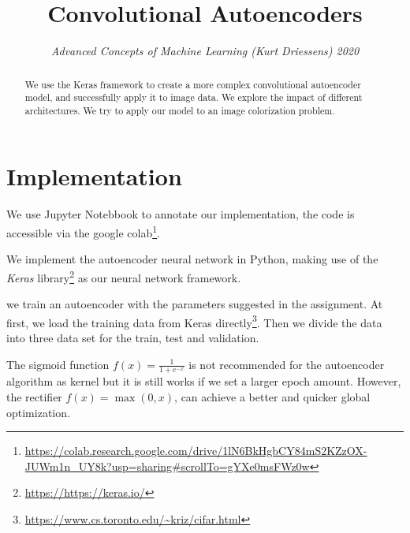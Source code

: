 \documentclass[conference]{IEEEtran}
\title{Convolutional Autoencoders}
\author{\IEEEauthorblockN{David Pomerenke, JingYang Zeng} 
\textit{Advanced Concepts of Machine Learning (Kurt Driessens) 2020} \\
\IEEEauthorblockA{\textit{Department of Data Science and Knowledge Engineering, Maastricht University}
}}
\begin{document}
\maketitle

\thispagestyle{plain} %
\pagestyle{plain} %

\begin{abstract}
    We use the Keras framework to create a more complex convolutional autoencoder model, and successfully apply it to image data. We explore the impact of different architectures. We try to apply our model to an image colorization problem.
\end{abstract}



\section{Implementation}

We use Jupyter Notebbook to annotate our implementation, the code is accessible via the google colab\footnote{\url{https://colab.research.google.com/drive/1lN6BkHgbCY84mS2KZzOX-JUWm1n_UY8k?usp=sharing#scrollTo=gYXe0msFWz0w}}. 

We implement the autoencoder neural network in Python, making use of the \textit{Keras} library\footnote{\url{https://https://keras.io/}} as our neural network framework. 

we train an autoencoder with the parameters suggested in the assignment. At first, we load the training data from Keras directly\footnote{\url{https://www.cs.toronto.edu/~kriz/cifar.html}}. Then we divide the data into three data set for the train, test and validation.




The sigmoid function $f(x) = \frac{1}{1+e^{-x}}$ is not recommended for the autoencoder algorithm as kernel but it is still works if we set a larger epoch amount. However, the rectifier $f(x) = \max(0,x)$, can achieve a better and quicker global optimization.
\end{document}
